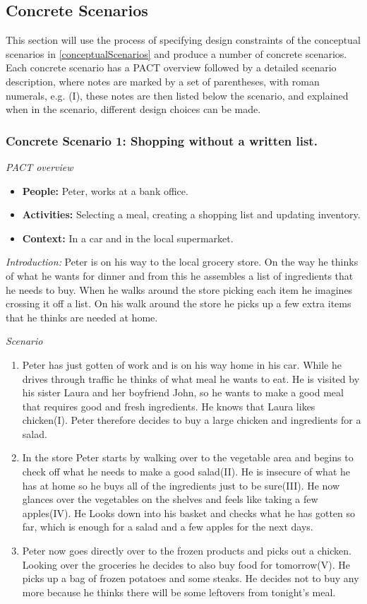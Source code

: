 \subsection{Concrete Scenarios}\label{ConcreteScenarios}
This section will use the process of specifying design constraints of the conceptual scenarios in \cref{conceptualScenarios} and produce a number of concrete scenarios. Each concrete scenario has a PACT overview followed by a detailed scenario description, where notes are marked by a set of parentheses, with roman numerals, e.g. (I), these notes are then listed below the scenario, and explained when in the scenario, different design choices can be made.

\subsubsection{Concrete Scenario 1: Shopping without a written list.}\label{ConcreteScenario1}

\emph{PACT overview}
\begin{itemize}
\item \textbf{People:} Peter, works at a bank office.
\item \textbf{Activities:} Selecting a meal, creating a shopping list and updating inventory.  
\item \textbf{Context:} In a car and in the local supermarket.
\end{itemize}

\emph{Introduction:} Peter is on his way to the local grocery store. On the way he thinks of what he wants for dinner and from this he assembles a list of ingredients that he needs to buy. When he walks around the store picking each item he imagines crossing it off a list. On his walk around the store he picks up a few extra items that he thinks are needed at home.

\emph{Scenario}
\begin{enumerate}
\item Peter has just gotten of work and is on his way home in his car. While he drives through traffic he thinks of what meal he wants to eat. He is visited by his sister Laura and her boyfriend John, so he wants to make a good meal that requires good and fresh ingredients. He knows that Laura likes chicken(I). Peter therefore decides to buy a large chicken and ingredients for a salad. 
\item In the store Peter starts by walking over to the vegetable area and begins to check off what he needs to make a good salad(II). He is insecure of what he has at home so he buys all of the ingredients just to be sure(III). He now glances over the vegetables on the shelves and feels like taking a few apples(IV). He Looks down into his basket and checks what he has gotten so far, which is enough for a salad and a few apples for the next days.
\item Peter now goes directly over to the frozen products and picks out a chicken. Looking over the groceries he decides to also buy food for tomorrow(V). He picks up a bag of frozen potatoes and some steaks. He decides not to buy any more because he thinks there will be some leftovers from tonight's meal.  
\end{enumerate}

